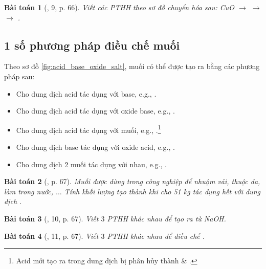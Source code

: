 \documentclass{article}
\newtheorem{baitoan}{Bài toán}
\begin{document}
\begin{baitoan}[\cite{SGK_KHTN_8_Canh_Dieu}, 9, p. 66]
	Viết các PTHH theo sơ đồ chuyển hóa sau: \emph{CuO $\to$  $\to$  $\to$ }.
\end{baitoan}

\subsection{1 số phương pháp điều chế muối}
Theo sơ đồ \ref{fig:acid_base_oxide_salt}, muối có thể được tạo ra bằng các phương pháp sau:
\begin{itemize}
	\item Cho dung dịch acid tác dụng với base, e.g., .
	\item Cho dung dịch acid tác dụng với oxide base, e.g., .
	\item Cho dung dịch acid tác dụng với muối, e.g., .\footnote{Acid  mới tạo ra trong dung dịch bị phân hủy thành  \& .}
	\item Cho dung dịch base tác dụng với oxide acid, e.g., .
	\item Cho dung dịch 2 muối tác dụng với nhau, e.g., .
\end{itemize}

\begin{baitoan}[\cite{SGK_KHTN_8_Canh_Dieu}, p. 67]
	Muối \emph{} được dùng trong công nghiệp để nhuộm vải, thuộc da, làm trong nước, $\ldots$ Tính khối lượng \emph{} tạo thành khi cho \emph{51 kg } tác dụng hết với dung dịch \emph{}.
\end{baitoan}

\begin{baitoan}[\cite{SGK_KHTN_8_Canh_Dieu}, 10, p. 67]
	Viết $3$ PTHH khác nhau để tạo ra \emph{} từ \emph{NaOH}.
\end{baitoan}

\begin{baitoan}[\cite{SGK_KHTN_8_Canh_Dieu}, 11, p. 67]
	Viết $3$ PTHH khác nhau để điều chế \emph{}.
\end{baitoan}
\end{document}
